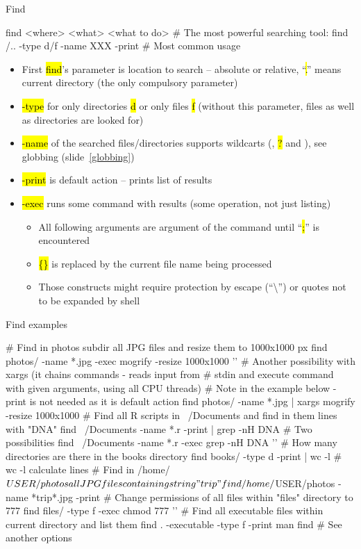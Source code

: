 \documentclass[compress, ucs, xelatex, 11pt, xcolor=svgnames,
  hyperref={
    bookmarks=true,
    unicode=true,
    colorlinks=true,
    pdftitle={Linux, command line and MetaCentrum},
    plainpages=false,
    pdfauthor={Vojtech Zeisek},
    pdfsubject={Course about use of Linux command line, writing shell scripts and using MetaCentrum of CESNET},
    pdfcreator={XeLaTeX},
    pdfkeywords={Linux, GNU, BASH, shell, command line, MetaCentrum},
    linkcolor=DarkRed,
    anchorcolor=DarkBlue,
    citecolor=Indigo,
    filecolor=NavyBlue,
    menucolor=DarkMagenta,
    urlcolor=DarkBlue,
    pdftex},
  url={hyphens, lowtilde} %
  ]{beamer}
\renewcommand{\texttt}[1]{\hl{\ttfamily #1}}
\begin{document}
\begin{frame}[fragile]{Find}
  \begin{bashcode}
    find <where> <what> <what to do> # The most powerful searching tool:
    find /.. -type d/f -name XXX -print # Most common usage
  \end{bashcode}
  \begin{itemize}
    \item First \texttt{find}'s parameter is location to search -- absolute or relative, ``\texttt{.}'' means current directory (the only compulsory parameter)
    \item \texttt{-type} for only directories \texttt{d} or only files \texttt{f} (without this parameter, files as well as directories are looked for)
    \item \texttt{-name} of the searched files/directories supports wildcarts (\texttt{*}, \texttt{?} and \texttt{[\ldots]}), see globbing (slide~\ref{globbing})
    \item \texttt{-print} is default action -- prints list of results
    \item \texttt{-exec} runs some command with results (some operation, not just listing)
    \begin{itemize}
      \item All following arguments are argument of the command until ``\texttt{;}'' is encountered
      \item \texttt{\{\}} is replaced by the current file name being processed
      \item Those constructs might require protection by escape (``\textbackslash'') or quotes not to be expanded by shell
    \end{itemize}
  \end{itemize}
\end{frame}

\begin{frame}[fragile]{Find examples}
  \begin{bashcode}
    # Find in photos subdir all JPG files and resize them to 1000x1000 px
    find photos/ -name *.jpg -exec mogrify -resize 1000x1000 '{}' \;
    # Another possibility with xargs (it chains commands - reads input from
    # stdin and execute command with given arguments, using all CPU threads)
    # Note in the example below -print is not needed as it is default action
    find photos/ -name *.jpg | xargs mogrify -resize 1000x1000
    # Find all R scripts in ~/Documents and find in them lines with "DNA"
    find ~/Documents -name *.r -print | grep -nH DNA # Two possibilities
    find ~/Documents -name *.r -exec grep -nH DNA '{}' \;
    # How many directories are there in the books directory
    find books/ -type d -print | wc -l # wc -l calculate lines
    # Find in /home/$USER/photos all JPG files containing string "trip"
    find /home/$USER/photos -name *trip*.jpg -print
    # Change permissions of all files within "files" directory to 777
    find files/ -type f -exec chmod 777 '{}' \;
    # Find all executable files within current directory and list them
    find . -executable -type f -print
    man find # See another options
  \end{bashcode}
\end{frame}
\end{document}
